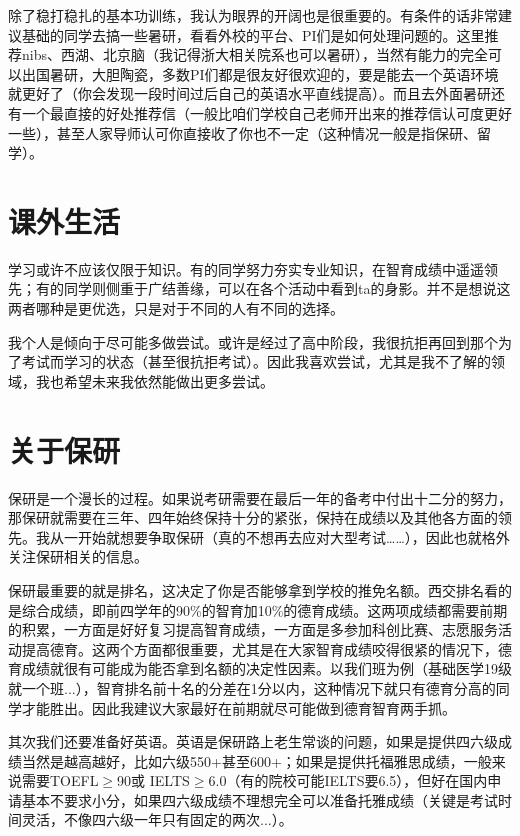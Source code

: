 \documentclass[zihao=-4,fontset=none]{Beautybook-CN}
\begin{document}
除了稳打稳扎的基本功训练，我认为眼界的开阔也是很重要的。有条件的话非常建议基础的同学去搞一些暑研，看看外校的平台、PI们是如何处理问题的。这里推荐nibs、西湖、北京脑（我记得浙大相关院系也可以暑研），当然有能力的完全可以出国暑研，大胆陶瓷，多数PI们都是很友好很欢迎的，要是能去一个英语环境就更好了（你会发现一段时间过后自己的英语水平直线提高）。而且去外面暑研还有一个最直接的好处\textemdash{}\textemdash{}推荐信（一般比咱们学校自己老师开出来的推荐信认可度更好一些），甚至人家导师认可你直接收了你也不一定（这种情况一般是指保研、留学）。

\section{课外生活}

学习或许不应该仅限于知识。有的同学努力夯实专业知识，在智育成绩中遥遥领先；有的同学则侧重于广结善缘，可以在各个活动中看到ta的身影。并不是想说这两者哪种是更优选，只是对于不同的人有不同的选择。

我个人是倾向于尽可能多做尝试。或许是经过了高中阶段，我很抗拒再回到那个为了考试而学习的状态（甚至很抗拒考试）。因此我喜欢尝试，尤其是我不了解的领域，我也希望未来我依然能做出更多尝试。

\section{关于保研}\label{basebaoyan}

保研是一个漫长的过程。如果说考研需要在最后一年的备考中付出十二分的努力，那保研就需要在三年、四年始终保持十分的紧张，保持在成绩以及其他各方面的领先。我从一开始就想要争取保研（真的不想再去应对大型考试{\ldots}{\ldots}），因此也就格外关注保研相关的信息。

保研最重要的就是排名，这决定了你是否能够拿到学校的推免名额。西交排名看的是综合成绩，即前四学年的90\%的智育加10\%的德育成绩。这两项成绩都需要前期的积累，一方面是好好复习提高智育成绩，一方面是多参加科创比赛、志愿服务活动提高德育。这两个方面都很重要，尤其是在大家智育成绩咬得很紧的情况下，德育成绩就很有可能成为能否拿到名额的决定性因素。以我们班为例（基础医学19级就一个班...），智育排名前十名的分差在1分以内，这种情况下就只有德育分高的同学才能胜出。因此我建议大家最好在前期就尽可能做到德育智育两手抓。

其次我们还要准备好英语。英语是保研路上老生常谈的问题，如果是提供四六级成绩当然是越高越好，比如六级550+甚至600+；如果是提供托福雅思成绩，一般来说需要TOEFL${\geq}$90或 IELTS${\geq}$6.0（有的院校可能IELTS要6.5），但好在国内申请基本不要求小分，如果四六级成绩不理想完全可以准备托雅成绩（关键是考试时间灵活，不像四六级一年只有固定的两次...）。
\end{document}
